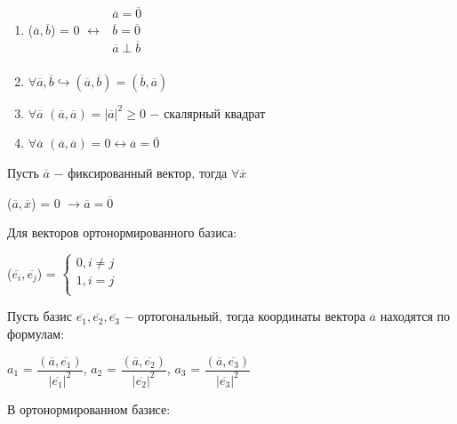 \begin{enumerate}
    \item ($\overline{a}, \overline{b}$) = 0 $\longleftrightarrow$
    $\begin{gathered}
        \overline{a} = \overline{0}\\
        \overline{b} = \overline{0}\\
        \overline{a} \perp \overline{b}\\
    \end{gathered}$
    \item $\forall\overline{a}, \overline{b}\hookrightarrow(\overline{a}, \overline{b}) = (\overline{b}, \overline{a})$
    \item $\forall\overline{a}$    $(\overline{a}, \overline{a}) = |\overline{a}|^2\geq0$ $-$ скалярный квадрат
    \item $\forall\overline{a}$    $(\overline{a}, \overline{a}) = 0 \longleftrightarrow \overline{a} = \overline{0}$
\end{enumerate}

\begin{lemma}
    Пусть $\overline{a}$ $-$ фиксированный вектор, тогда $\forall\overline{x}$
    \begin{center}
        ($\overline{a}, \overline{x}$) = 0 $\longrightarrow \overline{a} = \overline{0}$
    \end{center}
\end{lemma}

Для векторов ортонормированного базиса:
\begin{center}
    ($\overline{e_i}, \overline{e_j}$) = 
    $\begin{cases}
        0, i \neq  j\\
        1, i = j\\
    \end{cases}$
\end{center}

Пусть базис $\overline{e_1}, \overline{e_2}, \overline{e_3}$ $-$ ортогональный, тогда координаты вектора $\overline{a}$ находятся по формулам:

\begin{center}
    $a_1$ = $\dfrac{(\overline{a}, \overline{e_1})}{|\overline{e_1}|^2 }$, $a_2$ = $\dfrac{(\overline{a}, \overline{e_2})}{|\overline{e_2}|^2 }$, $a_3$ = $\dfrac{(\overline{a}, \overline{e_3})}{|\overline{e_3}|^2 }$
\end{center}

В ортонормированном базисе:

